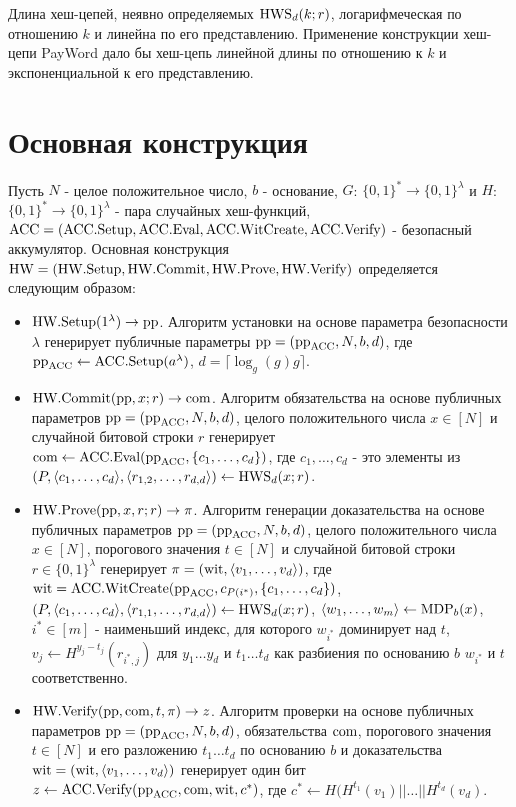 Длина хеш-цепей, неявно определяемых $\text{HWS}_d(k; r)$, логарифмеческая по отношению $k$ и линейна по его представлению.
Применение конструкции хеш-цепи PayWord \cite{10.1007/3-540-62494-5_6} дало бы хеш-цепь линейной длины по отношению к $k$ и экспоненциальной к его представлению.

\section{Основная конструкция} %
\begin{definition}
	Пусть $N$ - целое положительное число, $b$ - основание, $G$: $\{0, 1\}^* \rightarrow \{0, 1\}^\lambda$ и $H$: $\{0, 1\}^* \rightarrow \{0, 1\}^\lambda$ - пара случайных хеш-функций, $\text{ACC} = (\text{ACC}.\text{Setup}, \text{ACC}.\text{Eval}, \text{ACC}.\text{WitCreate}, \text{ACC}.\text{Verify})$ - безопасный аккумулятор.
	Основная конструкция $\text{HW} = (\text{HW}.\text{Setup}, \text{HW}.\text{Commit}, \text{HW}.\text{Prove}, \text{HW}.\text{Verify})$ определяется следующим образом:
	\begin{itemize}
		\item $\text{HW}.\text{Setup}(1^\lambda) \rightarrow \text{pp}$. Алгоритм установки на основе параметра безопасности $\lambda$ генерирует публичные параметры $\text{pp} = (\text{pp}_{\text{ACC}}, N, b, d)$, где $\text{pp}_{\text{ACC}} \leftarrow \text{ACC}.\text{Setup}(a^\lambda)$, $d = \lceil \log_g(g)g\rceil$.
		\item $\text{HW}.\text{Commit}(\text{pp}, x; r) \rightarrow \text{com}$. Алгоритм обязательства на основе публичных параметров $\text{pp} = (\text{pp}_{\text{ACC}}, N, b, d)$, целого положительного числа $x \in [N]$ и случайной битовой строки $r$ генерирует $\text{com} \leftarrow \text{ACC}.\text{Eval}(\text{pp}_{\text{ACC}}, \{c_1, \dots, c_d\})$, где $c_1, \dots, c_d$ - это элементы из $(P, \langle c_1, \dots, c_d \rangle, \langle r_{1, 2}, \dots, r_{d, d} \rangle) \leftarrow \text{HWS}_d(x; r)$.
		\item $\text{HW}.\text{Prove}(\text{pp}, x, r; r) \rightarrow \pi$. Алгоритм генерации доказательства на основе публичных параметров $\text{pp} = (\text{pp}_{\text{ACC}}, N, b, d)$, целого положительного числа $x \in [N]$, порогового значения $t \in [N]$ и случайной битовой строки $r \in \{0, 1\}^\lambda$ генерирует $\pi = (\text{wit}, \langle v_1, \dots, v_d \rangle)$, где $\text{wit} = \text{ACC}.\text{WitCreate}(\text{pp}_{\text{ACC}}, c_{P(i^*)}, \{c_1, \dots, c_d\})$, $(P, \langle c_1, \dots, c_d \rangle, \langle r_{1, 1}, \dots, r_{d, d} \rangle) \leftarrow \text{HWS}_d(x; r)$, $\langle w_1, \dots, w_m \rangle \leftarrow \text{MDP}_b(x)$, $i^* \in [m]$ - наименьший индекс, для которого $w_{i^*}$ доминирует над $t$, $v_j \leftarrow H^{y_j - t_j}(r_{i^*, j})$ для $y_1 \dots y_d$ и $t_1 \dots t_d$ как разбиения по основанию $b$ $w_{i^*}$ и $t$ соответственно.
		\item $\text{HW}.\text{Verify}(\text{pp}, \text{com}, t, \pi) \rightarrow z$. Алгоритм проверки на основе публичных параметров $\text{pp} = (\text{pp}_{\text{ACC}}, N, b, d)$, обязательства $\text{com}$, порогового значения $t \in [N]$ и его разложению $t_1 \dots t_d$ по основанию $b$ и доказательства $\text{wit} = (\text{wit}, \langle v_1, \dots, v_d \rangle)$ генерирует один бит $z \leftarrow \text{ACC}.\text{Verify}(\text{pp}_{\text{ACC}}, \text{com}, \text{wit}, c^*)$, где $c^* \leftarrow H(H^{t_1}(v_1) || \dots || H^{t_d}(v_d)$.
	\end{itemize}
\end{definition}

